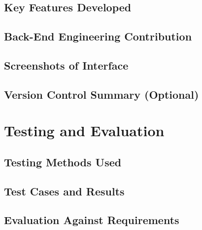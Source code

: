 \documentclass[14pt]{article}
\begin{document}
\subsection{Key Features Developed}

\subsection{Back-End Engineering Contribution}

\subsection{Screenshots of Interface}

\subsection{Version Control Summary (Optional)}


\section{Testing and Evaluation}

\subsection{Testing Methods Used}

\subsection{Test Cases and Results}

\subsection{Evaluation Against Requirements}
\end{document}
